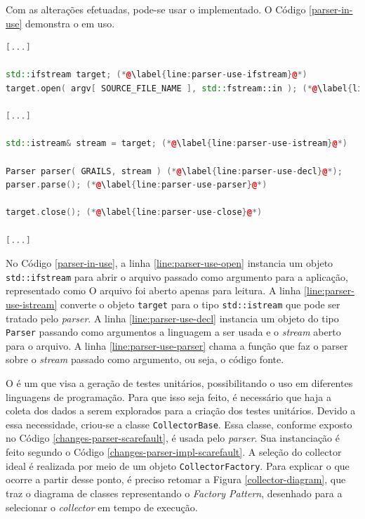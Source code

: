 Com as alterações efetuadas, pode-se usar o \parser implementado. O Código
\ref{parser-in-use} demonstra o \parser em uso.

\begin{lstlisting}[language=C++, label=parser-in-use, caption=\textit{Parser} em uso]
[...]

std::ifstream target; (*@\label{line:parser-use-ifstream}@*)
target.open( argv[ SOURCE_FILE_NAME ], std::fstream::in ); (*@\label{line:parser-use-open}@*)

[...]

std::istream& stream = target; (*@\label{line:parser-use-istream}@*)

Parser parser( GRAILS, stream ) (*@\label{line:parser-use-decl}@*);
parser.parse(); (*@\label{line:parser-use-parser}@*)

target.close(); (*@\label{line:parser-use-close}@*)

[...]
\end{lstlisting}

No Código \ref{parser-in-use}, a linha \ref{line:parser-use-open} instancia um
objeto \lstinline|std::ifstream| para abrir o arquivo passado como argumento para
a aplicação, representado como  O arquivo foi
aberto apenas para leitura. A linha \ref{line:parser-use-istream} converte o
objeto \lstinline|target| para o tipo \lstinline|std::istream| que pode ser tratado
pelo \textit{parser}. A linha \ref{line:parser-use-decl} instancia um objeto do
tipo \lstinline|Parser| passando como argumentos a linguagem a ser usada e o
\textit{stream} aberto para o arquivo. A linha \ref{line:parser-use-parser} chama
a função que faz o {parser} sobre o \textit{stream} passado como argumento, ou seja,
o código fonte.

O \scarefault é um \framework que visa a geração de testes unitários, possibilitando
o uso em diferentes linguagens de programação. Para que isso seja feito, é necessário
que haja a coleta dos dados a serem explorados para a criação dos testes unitários.
Devido a essa necessidade, criou-se a classe \lstinline|CollectorBase|. Essa classe,
conforme exposto no Código \ref{changes-parser-scarefault}, é usada pelo \textit{parser}.
Sua instanciação é feito segundo o Código \ref{changes-parser-impl-scarefault}. A seleção do \textsf{collector} ideal é realizada por meio de um objeto \lstinline|CollectorFactory|. Para explicar o que ocorre a partir desse ponto, é preciso retomar a Figura
\ref{collector-diagram}, que traz o diagrama de classes representando o
\textit{Factory Pattern}, desenhado para a selecionar o \textit{collector} em tempo
de execução.

